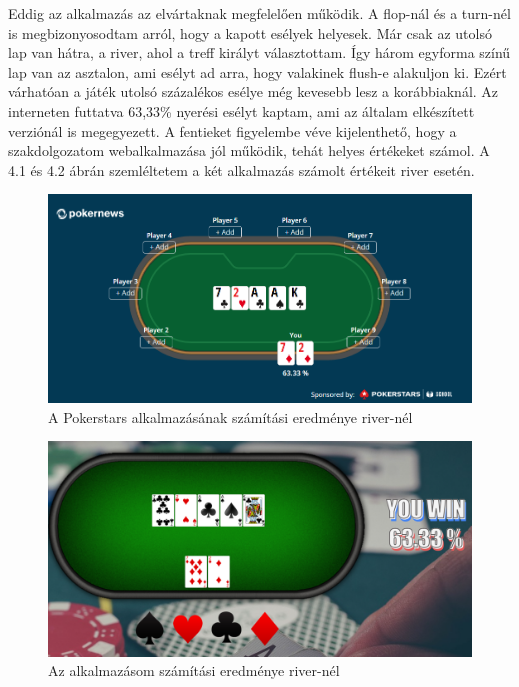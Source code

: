 Eddig az alkalmazás az elvártaknak megfelelően működik. A flop-nál és a turn-nél is megbizonyosodtam arról, hogy a kapott esélyek helyesek. Már csak az utolsó lap van hátra, a river, ahol a treff királyt választottam. Így három egyforma színű lap van az asztalon, ami esélyt ad arra, hogy valakinek flush-e alakuljon ki. Ezért várhatóan a játék utolsó százalékos esélye még kevesebb lesz a korábbiaknál. Az interneten futtatva 63,33\% nyerési esélyt kaptam, ami az általam elkészített verziónál is megegyezett. A fentieket figyelembe véve kijelenthető, hogy a szakdolgozatom webalkalmazása jól működik, tehát helyes értékeket számol. A 4.1 és 4.2 ábrán szemléltetem a két alkalmazás számolt értékeit river esetén.

\begin{figure}[h]
\centering
\includegraphics[scale=0.7]{images/test-ps.png}
\caption{A Pokerstars alkalmazásának számítási eredménye river-nél}
\label{fig:test-ps}
\end{figure}

\begin{figure}[h]
\centering
\includegraphics[scale=0.47]{images/test-my.png}
\caption{Az alkalmazásom számítási eredménye river-nél}
\label{fig:test-my}
\end{figure}

